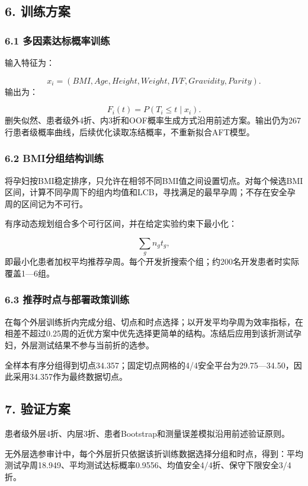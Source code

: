 \documentclass[UTF8,12pt,a4paper]{ctexart}
\begin{document}
\subsection{6. 训练方案}
\subsubsection{6.1 多因素达标概率训练}
输入特征为：

\[
x_i=(BMI,Age,Height,Weight,IVF,Gravidity,Parity).
\]
输出为：

\[
F_i(t)=P(T_i\le t\mid x_i).
\]
删失似然、患者级外4折、内3折和OOF概率生成方式沿用前述方案。输出仍为267行患者级概率曲线，后续优化读取冻结概率，不重新拟合AFT模型。

\subsubsection{6.2 BMI分组结构训练}
将孕妇按BMI稳定排序，只允许在相邻不同BMI值之间设置切点。对每个候选BMI区间，计算不同孕周下的组内均值和LCB，寻找满足\textsf{}的最早孕周；不存在安全孕周的区间记为不可行。

有序动态规划组合多个可行区间，并在给定实验约束下最小化：

\[
\sum_g n_gt_g,
\]
即最小化患者加权平均推荐孕周。每个开发折搜索\textsf{}个组；约200名开发患者时实际覆盖1—6组。

\subsubsection{6.3 推荐时点与部署政策训练}
在每个外层训练折内完成分组、切点和时点选择；以开发平均孕周为效率指标，在相差不超过0.25周的近优方案中优先选择更简单的结构。冻结后应用到该折测试孕妇，外层测试结果不参与当前折的选参。

全样本有序分组得到切点34.357；固定切点网格的4/4安全平台为29.75—34.50，因此采用34.357作为最终数据切点。

\subsection{7. 验证方案}
患者级外层4折、内层3折、患者Bootstrap和测量误差模拟沿用前述验证原则。

无外层选参审计中，每个外层折只依据该折训练数据选择分组和时点，得到：平均测试孕周18.949、平均测试达标概率0.9556、均值安全4/4折、保守下限安全3/4折。
\end{document}
